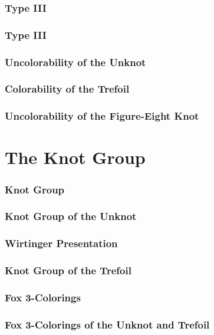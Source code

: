 \documentclass{beamer}
\begin{document}
\begin{frame}
  \frametitle{Type III}
  
\end{frame}

\begin{frame}
  \frametitle{Type III}
  
\end{frame}

\begin{frame}
  \frametitle{Uncolorability of the Unknot}
  
\end{frame}

\begin{frame}
  \frametitle{Colorability of the Trefoil}
  
\end{frame}

\begin{frame}
  \frametitle{Uncolorability of the Figure-Eight Knot}
  
\end{frame}

\section{The Knot Group}

\begin{frame}
  \frametitle{Knot Group}
  
\end{frame}

\begin{frame}
  \frametitle{Knot Group of the Unknot}
  
\end{frame}

\begin{frame}
  \frametitle{Wirtinger Presentation}
  
\end{frame}

\begin{frame}
  \frametitle{Knot Group of the Trefoil}
  
\end{frame}

\begin{frame}
  \frametitle{Fox 3-Colorings}
  
\end{frame}

\begin{frame}
  \frametitle{Fox 3-Colorings of the Unknot and Trefoil}
  
\end{frame}
\end{document}

